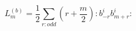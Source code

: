 \begin{equation}
L_{m}^{(b)}=\frac{1}{2}\sum_{r:odd}(r+\frac{m}{2}):b_{-r}^{i}b_{m+r}^{i}:
\end{equation}

